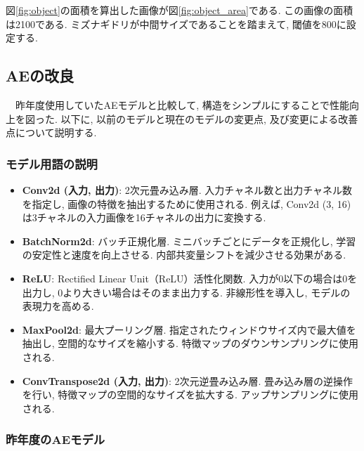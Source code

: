 \documentclass[a4paper, 12pt]{report}
\begin{document}
図\ref{fig:object}の面積を算出した画像が図\ref{fig:object_area}である. 
この画像の面積は2100である. ミズナギドリが中間サイズであることを踏まえて, 閾値を800に設定する. 

\newpage

\subsection{AEの改良}
　昨年度使用していたAEモデルと比較して, 構造をシンプルにすることで性能向上を図った. 以下に, 以前のモデルと現在のモデルの変更点, 及び変更による改善点について説明する. 

\subsubsection{モデル用語の説明}

\begin{itemize}
    \item \textbf{Conv2d (入力, 出力)}: 2次元畳み込み層. 入力チャネル数と出力チャネル数を指定し, 画像の特徴を抽出するために使用される. 例えば, Conv2d (3, 16)は3チャネルの入力画像を16チャネルの出力に変換する. 
    \item \textbf{BatchNorm2d}: バッチ正規化層. ミニバッチごとにデータを正規化し, 学習の安定性と速度を向上させる. 内部共変量シフトを減少させる効果がある. 
    \item \textbf{ReLU}: Rectified Linear Unit（ReLU）活性化関数. 入力が0以下の場合は0を出力し, 0より大きい場合はそのまま出力する. 非線形性を導入し, モデルの表現力を高める. 
    \item \textbf{MaxPool2d}: 最大プーリング層. 指定されたウィンドウサイズ内で最大値を抽出し, 空間的なサイズを縮小する. 特徴マップのダウンサンプリングに使用される. 
    \item \textbf{ConvTranspose2d (入力, 出力)}: 2次元逆畳み込み層. 畳み込み層の逆操作を行い, 特徴マップの空間的なサイズを拡大する. アップサンプリングに使用される. 
\end{itemize}

\newpage

\subsubsection{昨年度のAEモデル}
\end{document}
